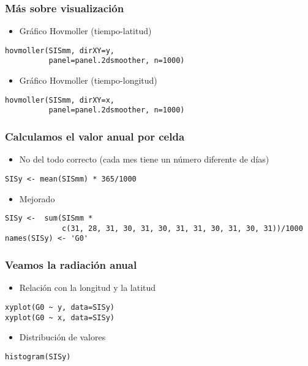 \documentclass[xcolor={usenames,svgnames,dvipsnames}]{beamer}
\begin{document}
\begin{frame}[fragile]
\frametitle{Más sobre visualización}
\label{sec-2-5}

\begin{itemize}
\item Gráfico Hovmoller (tiempo-latitud)
\end{itemize}

\lstset{language=R}
\begin{lstlisting}
hovmoller(SISmm, dirXY=y,
          panel=panel.2dsmoother, n=1000)
\end{lstlisting}
\begin{itemize}
\item Gráfico Hovmoller (tiempo-longitud)
\end{itemize}

\lstset{language=R}
\begin{lstlisting}
hovmoller(SISmm, dirXY=x,
          panel=panel.2dsmoother, n=1000)
\end{lstlisting}
\end{frame}
\begin{frame}[fragile]
\frametitle{Calculamos el valor anual por celda}
\label{sec-2-6}

\begin{itemize}
\item No del todo correcto (cada mes tiene un número diferente de días)
\end{itemize}

\lstset{language=R}
\begin{lstlisting}
SISy <- mean(SISmm) * 365/1000
\end{lstlisting}
\begin{itemize}
\item Mejorado
\end{itemize}

\lstset{language=R}
\begin{lstlisting}
SISy <-  sum(SISmm *
             c(31, 28, 31, 30, 31, 30, 31, 31, 30, 31, 30, 31))/1000
names(SISy) <- 'G0'
\end{lstlisting}
\end{frame}
\begin{frame}[fragile]
\frametitle{Veamos la radiación anual}
\label{sec-2-7}

\begin{itemize}
\item Relación con la longitud y la latitud
\end{itemize}

\lstset{language=R}
\begin{lstlisting}
xyplot(G0 ~ y, data=SISy)
xyplot(G0 ~ x, data=SISy)
\end{lstlisting}
\begin{itemize}
\item Distribución de valores
\end{itemize}

\lstset{language=R}
\begin{lstlisting}
histogram(SISy)
\end{lstlisting}
\end{frame}
\end{document}
